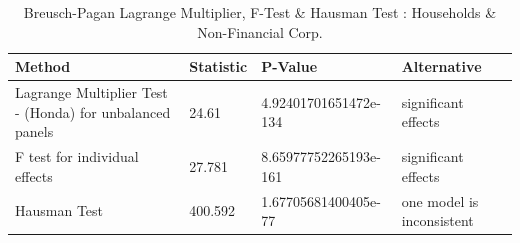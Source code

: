 \begin{table}[ht]
\centering
\caption{Breusch-Pagan Lagrange Multiplier, F-Test & Hausman Test : Households & Non-Financial Corp.} 
\begingroup\small
\begin{tabular}{llll}
  \toprule
Method & Statistic & P-Value & Alternative \\ 
  \midrule
Lagrange Multiplier Test -  (Honda) for unbalanced panels & 24.61 & 4.92401701651472e-134 & significant effects \\ 
  F test for individual effects & 27.781 & 8.65977752265193e-161 & significant effects \\ 
  Hausman Test & 400.592 & 1.67705681400405e-77 & one model is inconsistent \\ 
   \bottomrule
\end{tabular}
\endgroup
\end{table}
